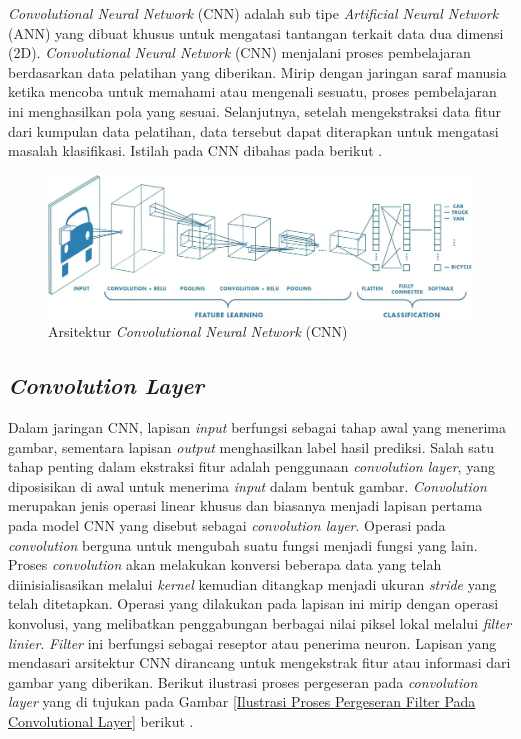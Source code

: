     \textit{Convolutional Neural Network} (CNN) adalah sub tipe \textit{Artificial Neural Network} (ANN) yang dibuat khusus untuk mengatasi tantangan terkait data dua dimensi (2D). \textit{Convolutional Neural Network} (CNN) menjalani proses pembelajaran berdasarkan data pelatihan yang diberikan. Mirip dengan jaringan saraf manusia ketika mencoba untuk memahami atau mengenali sesuatu, proses pembelajaran ini menghasilkan pola yang sesuai. Selanjutnya, setelah mengekstraksi data fitur dari kumpulan data pelatihan, data tersebut dapat diterapkan untuk mengatasi masalah klasifikasi. Istilah pada CNN dibahas pada  berikut  \cite{Alzubaidi2021}. 
    
  \begin{figure}[H]
      \centering
      \includegraphics[width=1\textwidth]{figures/bab2/arsitektur cnn.jpg}
      \caption{Arsitektur \textit{Convolutional Neural Network} (CNN) \cite{Prabhu}}
      \label{Arsitektur CNN}
    
    \end{figure}

\subsection{\textit{Convolution Layer}}

    Dalam jaringan CNN, lapisan \textit{input} berfungsi sebagai tahap awal yang menerima gambar, sementara lapisan \textit{output} menghasilkan label hasil prediksi. Salah satu tahap penting dalam ekstraksi fitur adalah penggunaan \textit{convolution layer}, yang diposisikan di awal untuk menerima \textit{input} dalam bentuk gambar. \textit{Convolution} merupakan jenis operasi linear khusus dan biasanya menjadi lapisan
    pertama pada model CNN yang disebut sebagai \textit{convolution layer}. Operasi pada
    \textit{convolution} berguna untuk mengubah suatu fungsi menjadi fungsi yang lain. Proses \textit{convolution} akan melakukan konversi
    beberapa data yang telah diinisialisasikan melalui \textit{kernel} kemudian ditangkap
    menjadi ukuran \textit{stride} yang telah ditetapkan.
    Operasi yang dilakukan pada lapisan ini mirip dengan operasi konvolusi, yang melibatkan penggabungan berbagai nilai piksel lokal melalui \textit{filter linier}. \textit{Filter} ini berfungsi sebagai reseptor atau penerima neuron. Lapisan yang mendasari arsitektur CNN dirancang untuk mengekstrak fitur atau informasi dari gambar yang diberikan. Berikut ilustrasi proses pergeseran pada \textit{convolution layer} yang di tujukan pada Gambar \ref{Ilustrasi Proses Pergeseran Filter Pada Convolutional Layer} berikut \cite{Dewi2018}.

